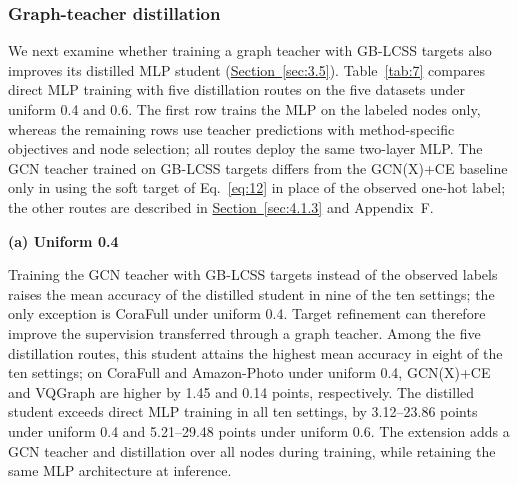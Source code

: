 \documentclass[10pt,letterpaper,nopreprintline]{elsarticle}
\theoremstyle{definition}
\theoremstyle{plain}
\begin{document}
\subsubsection{Graph-teacher distillation}\label{sec:4.4.1}

We next examine whether training a graph teacher with GB-LCSS targets also improves its distilled MLP student (\hyperref[sec:3.5]{Section~\ref*{sec:3.5}}). Table~\ref{tab:7} compares direct MLP training with five distillation routes on the five datasets under uniform 0.4 and 0.6. The first row trains the MLP on the labeled nodes only, whereas the remaining rows use teacher predictions with method-specific objectives and node selection; all routes deploy the same two-layer MLP. The GCN teacher trained on GB-LCSS targets differs from the GCN(X)+CE baseline only in using the soft target of Eq.~\eqref{eq:12} in place of the observed one-hot label; the other routes are described in \hyperref[sec:4.1.3]{Section~\ref*{sec:4.1.3}} and Appendix~F.

\begin{table}[!htb]
\centering
\caption{Test accuracy of deployed MLPs under direct training and graph-to-MLP distillation.}\label{tab:7}
{\small\textbf{(a) Uniform 0.4}}\par\smallskip



\par{}\par\smallskip



\end{table}

Training the GCN teacher with GB-LCSS targets instead of the observed labels raises the mean accuracy of the distilled student in nine of the ten settings; the only exception is CoraFull under uniform 0.4. Target refinement can therefore improve the supervision transferred through a graph teacher. Among the five distillation routes, this student attains the highest mean accuracy in eight of the ten settings; on CoraFull and Amazon-Photo under uniform 0.4, GCN(X)+CE and VQGraph are higher by 1.45 and 0.14 points, respectively. The distilled student exceeds direct MLP training in all ten settings, by 3.12--23.86 points under uniform 0.4 and 5.21--29.48 points under uniform 0.6. The extension adds a GCN teacher and distillation over all nodes during training, while retaining the same MLP architecture at inference.
\end{document}
